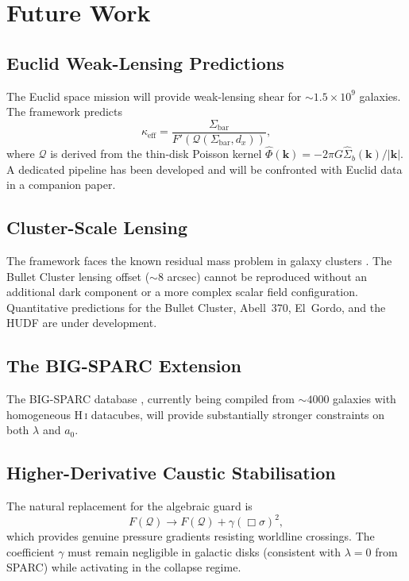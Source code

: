 \documentclass{aa}
\newcommand{\Q}{\mathcal{Q}}
\newcommand{\azero}{a_0}
\begin{document}
\section{Future Work}
\label{sec:future}

\subsection{Euclid Weak-Lensing Predictions}

The Euclid space mission \citep{Laureijs2011} will provide weak-lensing shear
for $\sim 1.5 \times 10^9$ galaxies. The framework predicts
\begin{equation}
  \kappa_\text{eff} = \frac{\Sigma_\text{bar}}{F'(\Q(\Sigma_\text{bar}, d_x))},
\end{equation}
where $\Q$ is derived from the thin-disk Poisson kernel
$\hat{\Phi}(\mathbf{k}) = -2\pi G\hat{\Sigma}_b(\mathbf{k})/|\mathbf{k}|$.
A dedicated pipeline has been developed and will be confronted with Euclid
data in a companion paper.

\subsection{Cluster-Scale Lensing}

The framework faces the known residual mass problem in galaxy clusters
\citep{Clowe2006,Angus2008}. The Bullet Cluster lensing offset ($\sim 8$
arcsec) cannot be reproduced without an additional dark component or a more
complex scalar field configuration. Quantitative predictions for the Bullet
Cluster, Abell~370, El~Gordo, and the HUDF are under development.

\subsection{The BIG-SPARC Extension}

The BIG-SPARC database \citep{Haubner2024}, currently being compiled from
$\sim 4000$ galaxies with homogeneous H\,\textsc{i} datacubes, will provide
substantially stronger constraints on both $\lambda$ and $\azero$.

\subsection{Higher-Derivative Caustic Stabilisation}

The natural replacement for the algebraic guard is
\begin{equation}
  F(\Q) \to F(\Q) + \gamma (\Box\sigma)^2,
\end{equation}
which provides genuine pressure gradients resisting worldline crossings. The
coefficient $\gamma$ must remain negligible in galactic disks (consistent
with $\lambda = 0$ from SPARC) while activating in the collapse regime.
\end{document}
